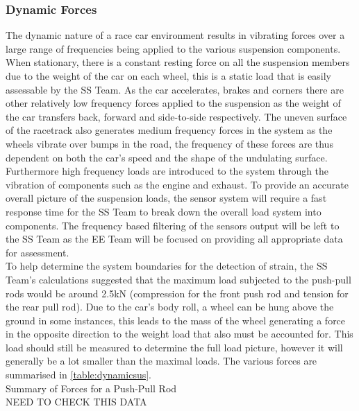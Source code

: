 \subsubsection{Dynamic Forces}
The dynamic nature of a race car environment results in vibrating forces over a large range of frequencies being applied to the various suspension components. When stationary, there is a constant resting force on all the suspension members due to the weight of the car on each wheel, this is a static load that is easily assessable by the SS Team. As the car accelerates, brakes and corners there are other relatively low frequency forces applied to the suspension as the weight of the car transfers back, forward and side-to-side respectively. The uneven surface of the racetrack also generates medium frequency forces in the system as the wheels vibrate over bumps in the road, the frequency of these forces are thus dependent on both the car's speed and the shape of the undulating surface. Furthermore high frequency loads are introduced to the system through the vibration of components such as the engine and exhaust. To provide an accurate overall picture of the suspension loads, the sensor system will require a fast response time for the SS Team to break down the overall load system into components. The frequency based filtering of the sensors output will be left to the SS Team as the EE Team will be focused on providing all appropriate data for assessment.\\
To help determine the system boundaries for the detection of strain, the SS Team's calculations suggested that the maximum load subjected to the push-pull rods would be around 2.5kN (compression for the front push rod and tension for the rear pull rod). Due to the car's body roll, a wheel can be hung above the ground in some instances, this leads to the mass of the wheel generating a force in the opposite direction to the weight load that also must be accounted for. This load should still be measured to determine the full load picture, however it will generally be a lot smaller than the maximal loads. The various forces are summarised in \ref{table:dynamicsus}.\\

Summary of Forces for a Push-Pull Rod\\

NEED TO CHECK THIS DATA\\

